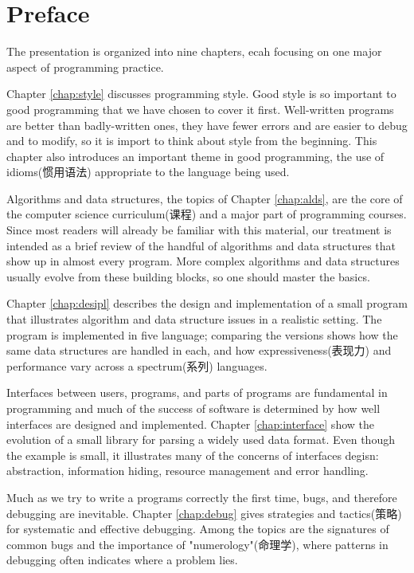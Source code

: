 
\chapter{Preface}
The presentation is organized into nine chapters, ecah focusing on one
major aspect of programming practice.

Chapter \ref{chap:style} discusses programming style. Good style is so
important to good programming that we have chosen to cover it first.
Well-written programs are better than badly-written ones, they have fewer
errors and are easier to debug and to modify, so it is import to think
about style from the beginning. This chapter also introduces an important
theme in good programming, the use of idioms(惯用语法) appropriate to the
language being used.

Algorithms and data structures, the topics of Chapter \ref{chap:alds}, are
the core of the computer science curriculum(课程) and a major part of
programming courses. Since most readers will already be familiar with this
material, our treatment is intended as a brief review of the handful of
algorithms and data structures that show up in almost every program. More
complex algorithms and data structures usually evolve from these building
blocks, so one should master the basics.

Chapter \ref{chap:desipl} describes the design and implementation of a
small program that illustrates algorithm and data structure issues in a
realistic setting. The program is implemented in five language; comparing
the versions shows how the same data structures are handled in each, and
how expressiveness(表现力) and performance vary across a spectrum(系列)
languages.

Interfaces between users, programs, and parts of programs are fundamental
in programming and much of the success of software is determined by how
well interfaces are designed and implemented. Chapter \ref{chap:interface}
show the evolution of a small library for parsing a widely used data
format. Even though the example is small, it illustrates many of the
concerns of interfaces degisn: abstraction, information hiding, resource
management and error handling.

Much as we try to write a programs correctly the first time, bugs, and
therefore debugging are inevitable. Chapter \ref{chap:debug} gives
strategies and tactics(策略) for systematic and effective debugging. Among
the topics are the signatures of common bugs and the importance of
"numerology"(命理学), where patterns in debugging often indicates where a
problem lies.

